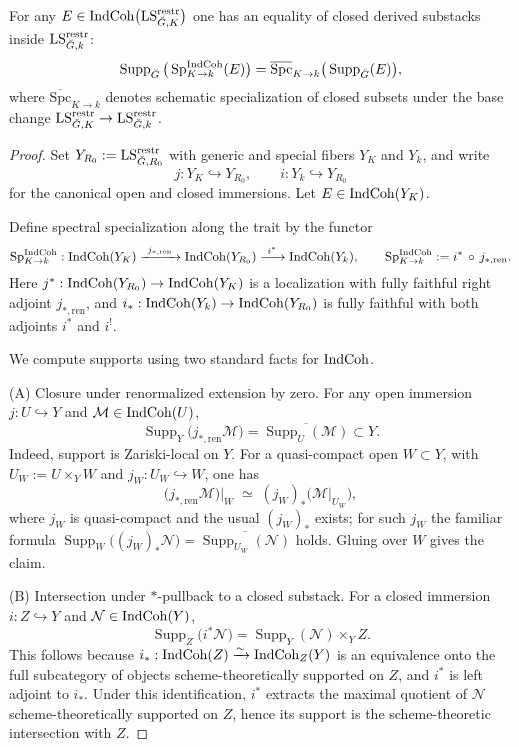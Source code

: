 \begin{proposition}\label{prop:supp-specialization}
For any $E\in\mathrm{IndCoh}\big(\mathrm{LS}^{\mathrm{restr}}_{\breve G,K}\big)$ one has an equality of closed derived substacks inside $\mathrm{LS}^{\mathrm{restr}}_{\breve G,k}$:
\[
\operatorname{Supp}_{\breve G}\big(\operatorname{Sp}^{\mathrm{IndCoh}}_{K\to k}(E)\big)
=\overline{\mathrm{Spc}}_{K\to k}\big(\operatorname{Supp}_{\breve G}(E)\big),
\]
where $\overline{\mathrm{Spc}}_{K\to k}$ denotes schematic specialization of closed subsets under the base change $\mathrm{LS}^{\mathrm{restr}}_{\breve G,K}\to\mathrm{LS}^{\mathrm{restr}}_{\breve G,k}$.
\end{proposition}

\begin{proof}
Set $Y_{R_0}:=\mathrm{LS}^{\mathrm{restr}}_{\breve G,R_0}$ with generic and special fibers $Y_K$ and $Y_k$, and write
\[
 j: Y_K\hookrightarrow Y_{R_0},\qquad i: Y_k\hookrightarrow Y_{R_0}
\]
for the canonical open and closed immersions. Let $E\in\mathrm{IndCoh}(Y_K)$.

Define spectral specialization along the trait by the functor
\[
\Sp^{\IndCoh}_{K\to k}:
\IndCoh(Y_K)\xrightarrow{\ j_{*,\mathrm{ren}}\ }\IndCoh(Y_{R_0})\xrightarrow{\ i^*\ }\IndCoh(Y_k),
\qquad \Sp^{\IndCoh}_{K\to k}:=i^*\ccomp j_{*,\mathrm{ren}}.
\]
Here $j^*:\mathrm{IndCoh}(Y_{R_0})\to\mathrm{IndCoh}(Y_K)$ is a localization with fully faithful right adjoint $j_{*,\mathrm{ren}}$, and $i_*:\mathrm{IndCoh}(Y_k)\to\mathrm{IndCoh}(Y_{R_0})$ is fully faithful with both adjoints $i^*$ and $i^!$.

We compute supports using two standard facts for $\mathrm{IndCoh}$.

(A) Closure under renormalized extension by zero. For any open immersion $j:U\hookrightarrow Y$ and $\mathcal M\in\mathrm{IndCoh}(U)$,
\[
\operatorname{Supp}_Y\big(j_{*,\mathrm{ren}}\mathcal M\big)=\overline{\operatorname{Supp}_U(\mathcal M)}\subset Y.
\]
Indeed, support is Zariski-local on $Y$. For a quasi-compact open $W\subset Y$, with $U_W:=U\times_Y W$ and $j_W:U_W\hookrightarrow W$, one has
\[
\big(j_{*,\mathrm{ren}}\mathcal M\big)\big|_W\;\simeq\;(j_W)_*\big(\mathcal M\big|_{U_W}\big),
\]
where $j_W$ is quasi-compact and the usual $(j_W)_*$ exists; for such $j_W$ the familiar formula $\operatorname{Supp}_W\big((j_W)_*\mathcal N\big)=\overline{\operatorname{Supp}_{U_W}(\mathcal N)}$ holds. Gluing over $W$ gives the claim.

(B) Intersection under $*$-pullback to a closed substack. For a closed immersion $i:Z\hookrightarrow Y$ and $\mathcal N\in\mathrm{IndCoh}(Y)$,
\[
\operatorname{Supp}_Z\big(i^*\mathcal N\big)=\operatorname{Supp}_Y(\mathcal N)\times_Y Z.
\]
This follows because $i_*:\mathrm{IndCoh}(Z)\xrightarrow{\sim}\mathrm{IndCoh}_Z(Y)$ is an equivalence onto the full subcategory of objects scheme-theoretically supported on $Z$, and $i^*$ is left adjoint to $i_*$. Under this identification, $i^*$ extracts the maximal quotient of $\mathcal N$ scheme-theoretically supported on $Z$, hence its support is the scheme-theoretic intersection with $Z$.


\end{proof}

